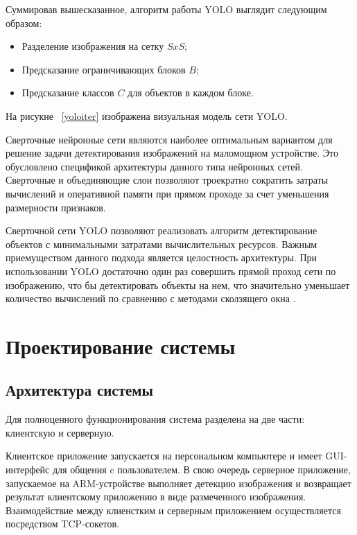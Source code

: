 \documentclass[a4paper,english,russian]{G2-105}
\begin{document}
\par Суммировав вышесказанное, алгоритм работы YOLO выглядит следующим образом:
\begin{itemize}
\item Разделение изображения на сетку $SxS$;
\item Предсказание ограничивающих блоков $B$;
\item Предсказание классов $C$ для объектов в каждом блоке.
\end{itemize}
\par На рисукне ~\ref{yoloiter} изображена визуальная модель сети YOLO.
\ttl
{}
\par Сверточные нейронные сети являются наиболее оптимальным вариантом для решение задачи детектирования изображений на маломощном устройстве. Это обусловлено спецификой архитектуры данного типа нейронных сетей. Сверточные и объединяющие слои позволяют троекратно сократить затраты вычислений и оперативной памяти при прямом проходе за счет уменьшения размерности признаков.
\par Сверточной сети YOLO позволяют реализовать алгоритм детектирование объектов с минимальными затратами вычислительных ресурсов. Важным приемуществом данного подхода является целостность архитектуры. При использовании YOLO достаточно один раз совершить прямой проход сети по изображению, что бы детектировать объекты на нем, что значительно уменьшает количество вычислений по сравнению с методами сколзящего окна \cite{19}.
\chapter{Проектирование системы}
\section{Архитектура системы}
\par Для полноценного функционирования система разделена на две части: клиентскую и серверную.
\par Клиентское приложение запускается на персональном компьютере и имеет GUI-интерфейс для общения c пользователем. В свою очередь серверное приложение, запускаемое на ARM-устройстве выполняет детекцию изображения и возвращает результат клиентскому приложению в виде размеченного изображения. Взаимодействие между клиенстким и серверным приложением осуществляется посредством TCP-сокетов.
\ttl
\end{document}
